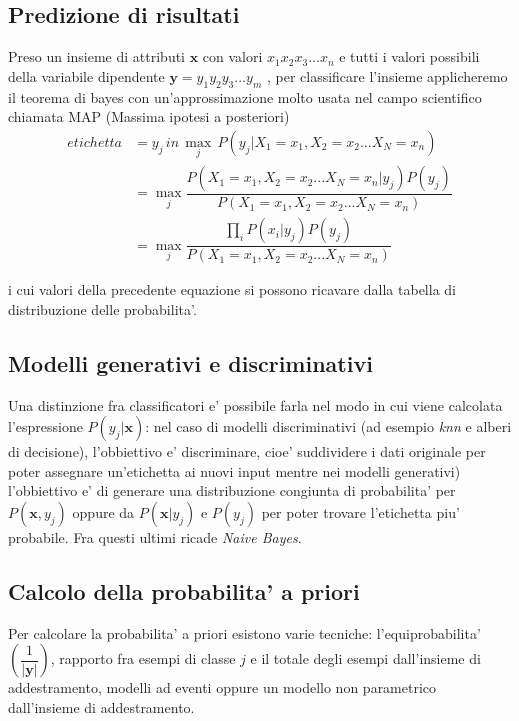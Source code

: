 \medskip
\subsection{Predizione di risultati}
Preso un insieme di attributi $\textbf{x}$ con valori $x_1x_2x_3...x_n$ e tutti i valori possibili della variabile dipendente $\textbf{y}=y_1y_2y_3...y_m$ , per classificare l'insieme applicheremo il teorema di bayes con un'approssimazione molto usata nel campo scientifico chiamata MAP (Massima ipotesi a posteriori)
\begin{align*}
		etichetta &=y_j \, in \, \max_j\,P(y_j|X_1=x_1, X_2=x_2...X_N=x_n) \\
		&= \max_j \dfrac{P(X_1=x_1,X_2=x_2...X_N=x_n|y_j)P(y_j)}{P(X_1=x_1, X_2=x_2...X_N=x_n)}\\
		&= \max_j \dfrac{\prod_iP(x_i|y_j)P(y_j)}{P(X_1=x_1, X_2=x_2...X_N=x_n)}
\end{align*}

i cui valori della precedente equazione si possono ricavare dalla tabella di distribuzione delle probabilita'.

\subsection{Modelli generativi e discriminativi}
Una distinzione fra classificatori e' possibile farla nel modo in cui viene calcolata l'espressione $P(y_j|\textbf{x})$: nel caso di modelli discriminativi  (ad esempio \textit{knn} e alberi di decisione), l'obbiettivo e' discriminare, cioe' suddividere i dati originale per poter assegnare un'etichetta ai nuovi input mentre nei modelli generativi) l'obbiettivo e' di generare una distribuzione congiunta di probabilita' per $P(\textbf{x}, y_j)$ oppure da $P(\textbf{x}| y_j)$ e $P(y_j)$ per poter trovare l'etichetta piu' probabile. Fra questi ultimi ricade \textit{Naive Bayes}.

\subsection{Calcolo della probabilita' a priori}
  Per calcolare la probabilita' a priori esistono varie tecniche: l'equiprobabilita' $\left(\dfrac{1}{|\textbf{y}|}\right)$, rapporto fra esempi di classe $j$ e il totale degli esempi dall'insieme di addestramento, modelli ad eventi oppure un modello non parametrico dall'insieme di addestramento.
  
